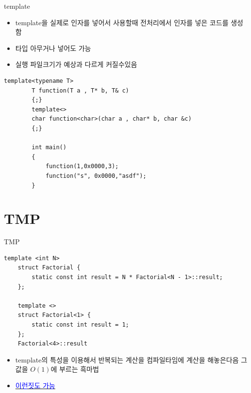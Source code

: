 \documentclass[10pt]{beamer}
\begin{document}
\begin{frame}{template}
    \begin{itemize}
        \item template을 실제로 인자를 넣어서 사용할때 전처리에서 인자를 넣은 코드를 생성함
        \item 타입 아무거나 넣어도 가능
        \item 실행 파일크기가 예상과 다르게 커질수있음
    \end{itemize}
\end{frame}    


\begin{frame}[fragile]{}
    \begin{lstlisting}[style = CStyle]
        template<typename T>
        T function(T a , T* b, T& c)
        {;}
        template<>
        char function<char>(char a , char* b, char &c)
        {;}

        int main()
        {
            function(1,0x0000,3);
            function("s", 0x0000,"asdf");
        }
    \end{lstlisting}
\end{frame}    



\begin{frame}{}

\end{frame}    

\begin{frame}{}
\end{frame}    

\begin{frame}{}
\end{frame}    

\begin{frame}{}
\end{frame}    


\section{TMP}

\begin{frame}[fragile]{TMP}
    \begin{lstlisting}[style = CStyle]
    template <int N>
    struct Factorial {
        static const int result = N * Factorial<N - 1>::result;
    };

    template <>
    struct Factorial<1> {
        static const int result = 1;
    };
    Factorial<4>::result
    \end{lstlisting}
    \begin{itemize}
        \item template의 특성을 이용해서 반복되는 계산을 컴파일타임에 계산을 해놓은다음 그 값을 $O(1)$에 부르는 흑마법
        \item \href{https://libsora.so/posts/friday-the-13th-tmp/}{\textcolor{blue}{이런짓도 가능}}
    \end{itemize}
    
\end{frame}    
\end{document}
